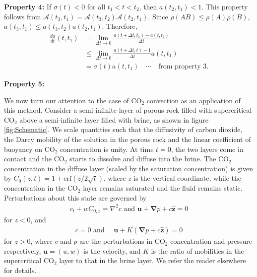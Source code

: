 \documentclass[letterpaper,10pt,prl,twocolumn,aps,reprint,superscriptaddress]{revtex4-1}
\newcommand{\cotwo}{CO$_2$ }
\newcommand{\erf}{\text{erf}}
\newcommand{\bu}{\boldsymbol{u}}
\newcommand{\bz}{\hat{\boldsymbol{z}}}
\newcommand{\grad}{\boldsymbol{\nabla}}
\newcommand{\cA}{\boldsymbol{\mathcal{A}}}
\begin{document}
{\bf Property 4:}
If $\sigma(t)<0$ for all $t_1<t<t_2$, then $a(t_2, t_1) < 1$.
This property follows from $\cA(t_3, t_1) = \cA(t_3, t_2) \cA(t_2, t_1)$. 
Since $\rho(AB) \le \rho(A) \rho(B)$, $a(t_3, t_1) \le a(t_3, t_2) a(t_2, t_1)$.
Therefore,
\begin{align}
 \frac{da}{dt}(t, t_1) &=    \lim_{\Delta t \to 0} \frac{a(t+\Delta t, t_1) - a(t, t_1)}{\Delta t} \nonumber \\
                       &\le \lim_{\Delta t \to 0} \frac{a(t+\Delta t, t) - 1}{\Delta t} a(t, t_1) \nonumber \\
                       &=   \sigma(t) a(t, t_1) \quad \cdots \quad \text{from property 3.} \nonumber
\end{align}

{\bf Property 5:}

We now turn our attention to the case of \cotwo convection as an application of this method. 
Consider a semi-infinite layer of porous rock filled with supercritical \cotwo above a semi-infinite layer filled with brine, as shown in figure \ref{fig:Schematic}. 
We scale quantities such that the diffusivity of carbon dioxide, the Darcy mobility of the solution in the porous rock and the linear coefficient of buoyancy on \cotwo concentration is unity. 
At time $t=0$, the two layers come in contact and the \cotwo starts to dissolve and diffuse into the brine. 
The \cotwo concentration in the diffuse layer (scaled by the saturation concentration) is given by $C_0(z,t) = 1 + \erf( {z}/{2\sqrt{t}})$, where $z$ is the vertical coordinate, while the concentration in the \cotwo layer remains saturated and the fluid remains static. 
Perturbations about this state are governed by 
\begin{align}
 c_t + w C_{0,z} = \nabla^2 c \text{ and }
 \bu + \grad p + c\bz = 0
 \label{eqn:linone}
\end{align}
for $z<0$, and 
\begin{align}
 c = 0 \text{ and } \quad \bu + K (\grad p + c\bz) = 0
 \label{eqn:lintwo}
\end{align}
for $z>0$, where $c$ and $p$ are the perturbations in \cotwo concentration and pressure respectively, $\bu = (u,w)$ is the velocity, and $K$ is the ratio of mobilities in the supercritical \cotwo layer to that in the brine layer. 
We refer the reader elsewhere\cite{SlimRama10} for details. 
\end{document}
